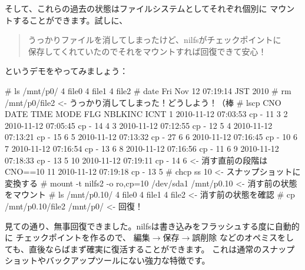 \documentclass[mingoth,a4paper]{jsarticle}
\begin{document}
そして、これらの過去の状態はファイルシステムとしてそれぞれ個別に
マウントすることができます。試しに、
\begin{quote}
\Large{うっかりファイルを消してしまったけど、nilfsがチェックポイントに\\
保存してくれていたのでそれをマウントすれば回復できて安心！}
\end{quote}
というデモをやってみましょう：

\begin{commandline}
# ls /mnt/p0/
4 file0  4 file1  4 file2
# date
Fri Nov 12 07:19:14 JST 2010
# rm /mnt/p0/file2                                       <- うっかり消してしまった！どうしよう！（棒
# lscp
CNO        DATE     TIME  MODE  FLG   NBLKINC       ICNT
  1  2010-11-12 07:03:53   cp    -         11          3
  2  2010-11-12 07:05:45   cp    -         14          4
  3  2010-11-12 07:12:55   cp    -         12          5
  4  2010-11-12 07:13:21   cp    -         15          6
  5  2010-11-12 07:13:32   cp    -         27          6
  6  2010-11-12 07:16:45   cp    -         10          6
  7  2010-11-12 07:16:54   cp    -         13          6
  8  2010-11-12 07:16:56   cp    -         11          6
  9  2010-11-12 07:18:33   cp    -         13          5
 10  2010-11-12 07:19:11   cp    -         14          6 <- 消す直前の段階はCNO==10
 11  2010-11-12 07:19:18   cp    -         13          5
# chcp ss 10                                             <- スナップショットに変換する
# mount -t nilfs2 -o ro,cp=10 /dev/sda1 /mnt/p0.10       <- 消す前の状態をマウント
# ls /mnt/p0.10/
4 file0  4 file1  4 file2                                <- 消す前の状態を確認
# cp /mnt/p0.10/file2 /mnt/p0/                           <- 回復！
\end{commandline}

見ての通り、無事回復できました。nilfsは書き込みをフラッシュする度に自動的に
チェックポイントを作るので、
編集$\rightarrow$保存$\rightarrow$誤削除
などのオペミスをしても、直後ならばまず確実に復活することができます。
これは通常のスナップショットやバックアップツールにない強力な特徴です。
\end{document}
